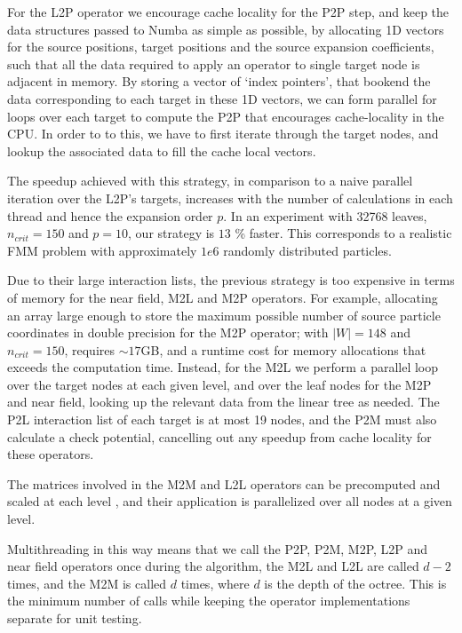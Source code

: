 \documentclass{IEEEcsmag}
\begin{document}
For the L2P operator we encourage cache locality for the P2P step, and keep the data structures passed to Numba as simple as possible, by allocating 1D vectors for the source positions, target positions and the source expansion coefficients, such that all the data required to apply an operator to single target node is adjacent in memory. By storing a vector of `index pointers', that bookend the data corresponding to each target in these 1D vectors, we can form parallel for loops over each target to compute the P2P that encourages cache-locality in the CPU. In order to to this, we have to first iterate through the target nodes, and lookup the associated data to fill the cache local vectors.

The speedup achieved with this strategy, in comparison to a naive parallel iteration over the L2P's targets, increases with the number of calculations in each thread and hence the expansion order $p$. In an experiment with 32768 leaves, $n_{crit} = 150$ and $p=10$, our strategy is $13$ \% faster. This corresponds to a realistic FMM problem with approximately $1e6$ randomly distributed particles.

Due to their large interaction lists, the previous strategy is too expensive in terms of memory for the near field, M2L and M2P operators. For example, allocating an array large enough to store the maximum possible number of source particle coordinates in double precision for the M2P operator; with $|W|=148$ and $n_{crit}=150$, requires $\sim 17$GB, and a runtime cost for memory allocations that exceeds the computation time. Instead, for the M2L we perform a parallel loop over the target nodes at each given level, and over the leaf nodes for the M2P and near field, looking up the relevant data from the linear tree as needed. The P2L interaction list of each target is at most 19 nodes, and the P2M must also calculate a check potential, cancelling out any speedup from cache locality for these operators.

The matrices involved in the M2M and L2L operators can be precomputed and scaled at each level \cite{Wang2021}, and their application is parallelized over all nodes at a given level.

Multithreading in this way means that we call the P2P, P2M, M2P, L2P and near field operators once during the algorithm, the M2L and L2L are called $d-2$ times, and the M2M is called $d$ times, where $d$ is the depth of the octree. This is the minimum number of calls while keeping the operator implementations separate for unit testing.
\end{document}
